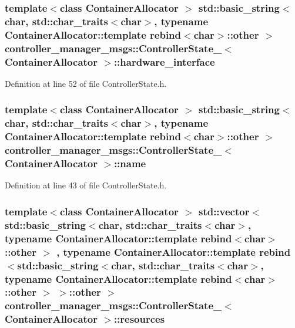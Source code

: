 \subsubsection[{hardware\-\_\-interface}]{\setlength{\rightskip}{0pt plus 5cm}template$<$class Container\-Allocator $>$ std\-::basic\-\_\-string$<$char, std\-::char\-\_\-traits$<$char$>$, typename \-Container\-Allocator\-::template rebind$<$char$>$\-::other $>$ {\bf controller\-\_\-manager\-\_\-msgs\-::\-Controller\-State\-\_\-}$<$ \-Container\-Allocator $>$\-::{\bf hardware\-\_\-interface}}\label{structcontroller__manager__msgs_1_1ControllerState___a2c4b958b63f0ea165817b1add5a89fdb}


\-Definition at line 52 of file \-Controller\-State.\-h.

\subsubsection[{name}]{\setlength{\rightskip}{0pt plus 5cm}template$<$class Container\-Allocator $>$ std\-::basic\-\_\-string$<$char, std\-::char\-\_\-traits$<$char$>$, typename \-Container\-Allocator\-::template rebind$<$char$>$\-::other $>$ {\bf controller\-\_\-manager\-\_\-msgs\-::\-Controller\-State\-\_\-}$<$ \-Container\-Allocator $>$\-::{\bf name}}\label{structcontroller__manager__msgs_1_1ControllerState___ad1bb21eb1f7df4f2952368e295055805}


\-Definition at line 43 of file \-Controller\-State.\-h.

\subsubsection[{resources}]{\setlength{\rightskip}{0pt plus 5cm}template$<$class Container\-Allocator $>$ std\-::vector$<$std\-::basic\-\_\-string$<$char, std\-::char\-\_\-traits$<$char$>$, typename \-Container\-Allocator\-::template rebind$<$char$>$\-::other $>$ , typename \-Container\-Allocator\-::template rebind$<$std\-::basic\-\_\-string$<$char, std\-::char\-\_\-traits$<$char$>$, typename \-Container\-Allocator\-::template rebind$<$char$>$\-::other $>$ $>$\-::other $>$ {\bf controller\-\_\-manager\-\_\-msgs\-::\-Controller\-State\-\_\-}$<$ \-Container\-Allocator $>$\-::{\bf resources}}\label{structcontroller__manager__msgs_1_1ControllerState___a078f4981a04be8aeb67655bc18aa8fd2}


